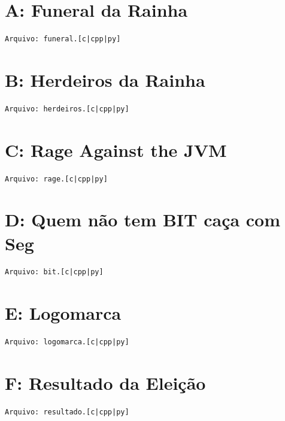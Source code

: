 \documentclass[12pt,oneside]{article} %
\begin{document}
\newpage
\section*{A: Funeral da Rainha} %
\vspace{-0.52cm}
\noindent \begin{verbatim}Arquivo: funeral.[c|cpp|py]\end{verbatim}


\newpage
\section*{B: Herdeiros da Rainha} %
\vspace{-0.52cm}
\noindent \begin{verbatim}Arquivo: herdeiros.[c|cpp|py]\end{verbatim}


\newpage
\section*{C: Rage Against the JVM} %
\vspace{-0.52cm}
\noindent \begin{verbatim}Arquivo: rage.[c|cpp|py]\end{verbatim}


\newpage
\section*{D: Quem não tem BIT caça com Seg} %
\vspace{-0.52cm}
\noindent \begin{verbatim}Arquivo: bit.[c|cpp|py]\end{verbatim}


\newpage
\section*{E: Logomarca} %
\vspace{-0.52cm}
\noindent \begin{verbatim}Arquivo: logomarca.[c|cpp|py]\end{verbatim}


\newpage
\section*{F: Resultado da Eleição} %
\vspace{-0.52cm}
\noindent \begin{verbatim}Arquivo: resultado.[c|cpp|py]\end{verbatim}

\end{document}
